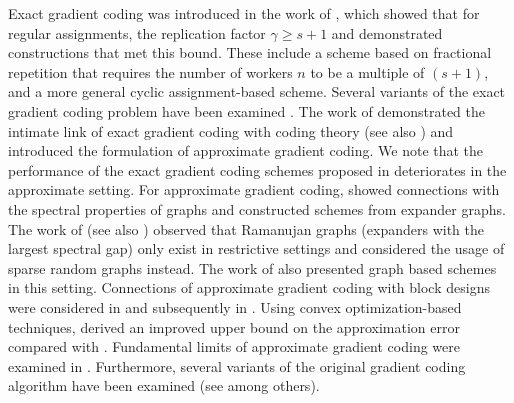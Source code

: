 \documentclass[journal,draftcls,onecolumn]{IEEEtran}
\theoremstyle{mystyle}
\newcommand{\aditya}[1]{\marginpar{+}{\bf Aditya's remark}: {\em #1}}
\begin{document}
Exact gradient coding was introduced in the work of \cite{tandon_gradient}, which showed that for regular assignments, the replication factor $\gamma \geq s+1$ and demonstrated constructions that met this bound. These include a scheme based on fractional repetition \cite{el2010fractional,olmezR16} that requires the number of workers $n$ to be a multiple of $(s+1)$, and a more general cyclic assignment-based scheme. Several variants of the exact gradient coding problem have been examined \cite{10.5555/3327345.3327412,tieredGC20,dynamicClusteringGC23,numerically_stableGC20,byzantine_GC23}. The work of \cite{dimakis_cyclic_mds} demonstrated the intimate link of exact gradient coding with coding theory (see also \cite{reedsolomon_GC18}) and introduced the formulation of approximate gradient coding. We note that the performance of the exact gradient coding schemes proposed in \cite{tandon_gradient} deteriorates in the approximate setting. For approximate gradient coding, \cite{dimakis_cyclic_mds} showed connections with the spectral properties of graphs and constructed schemes from expander graphs.  The work of \cite{charles2017approximate} (see also \cite{charles2018gradient}) observed that Ramanujan graphs (expanders with the largest spectral gap) only exist in restrictive settings and considered the usage of sparse random graphs instead. The work of \cite{glasgowW21} also presented graph based schemes in this setting. Connections of approximate gradient coding with block designs were considered in \cite{kadheKR19} and subsequently in \cite{soft_BIBD_GC22}. Using convex optimization-based techniques, \cite{11195507} derived an improved upper bound on the approximation error compared with \cite{dimakis_cyclic_mds}. Fundamental limits of approximate gradient coding were examined in \cite{wang2019fundamental}. Furthermore, several variants of the original gradient coding algorithm have been examined (see \cite{BitarSGC19, treeGC19, partial_recoveryGC23,10.1109/TIT.2024.3420222, krishnan2023sequential} among others).%
\end{document}
